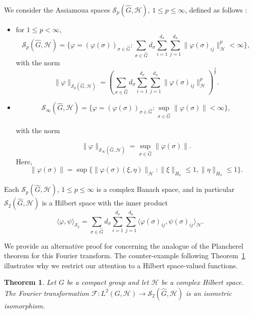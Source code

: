 \documentclass[10pt,a4paper]{amsart}
\newtheorem{theorem}{Theorem}[section]
\begin{document}
We consider the Assiamoua spaces $\mathscr{S}_p(\widehat{G}, \mathcal{H}),\, 1\le p\le \infty$, defined as follows \cite{Mensah2024}:
\begin{itemize}
\item for $1\le p<\infty$, 
$$\mathscr{S}_p(\widehat{G},\mathcal{H})=\Big\{\varphi=(\varphi(\sigma))_{\sigma\in \widehat{G}}:
\sum_{\sigma\in \widehat{G}} d_\sigma\sum_{i=1}^{d_\sigma}\sum_{j=1}^{d_\sigma}\|\varphi(\sigma)_{ij}\|_\mathcal{H}^p<\infty\Big\},
$$
with the norm 
$$ \|\varphi\|_{\mathscr{S}_p(\widehat{G},\mathcal{H})}=\left(\sum_{\sigma\in \widehat{G}} d_\sigma\sum_{i=1}^{d_\sigma}\sum_{j=1}^{d_\sigma}\|\varphi(\sigma)_{ij}\|_\mathcal{H}^p\right)^{\frac{1}{p}}.
$$
\item $$\mathscr{S}_\infty(\widehat{G},\mathcal{H})=\Big\{  \varphi=(\varphi(\sigma))_{\sigma\in \widehat{G}}: \sup_{\sigma \in \widehat{G}}\|\varphi(\sigma)\| <\infty \Big\},$$

with the norm 

$$\|\varphi\|_{\mathscr{S}_\infty(\widehat{G},\mathcal{H})}=\sup_{\sigma \in \widehat{G}}\|\varphi(\sigma)\|.$$
Here,  
$$\|\varphi(\sigma)\|=\sup\Big\{\|\varphi(\sigma)(\xi,\eta)\|_{\mathcal{H}}: \|\xi\|_{H_\sigma}\leq 1, \|\eta\|_{H_\sigma}\leq 1\Big\}.$$
\end{itemize}

 
\noindent Each $\mathscr{S}_p(\widehat{G},\mathcal{H}), \, 1\leq p\leq \infty$ is a complex Banach
space, and in particular $\mathscr{S}_2(\widehat{G},\mathcal{H})$ is a Hilbert space with the inner product
$$\langle\varphi,\psi\rangle_{\mathscr{S}_2}=\sum_{\sigma\in \widehat{G}} d_\sigma\sum_{i=1}^{d_\sigma}\sum_{j=1}^{d_\sigma}\langle
\varphi(\sigma)_{ij},\psi(\sigma)_{ij}\rangle_\mathcal{H}.$$

\noindent We provide an alternative proof for \cite[Theorem 4.8]{Assiamoua1989} concerning the analogue of the Plancherel theorem for this Fourier transform. The counter-example following  Theorem~\ref{theo:plancherel} illustrates why we restrict our attention to a Hilbert space-valued functions. 
\begin{theorem}\label{theo:plancherel}
Let $G$ be a compact group and let $\mathcal{H}$ be a complex Hilbert space.   The Fourier transformation $\mathscr{F}:L^2(G,\mathcal{H})\to \mathscr{S}_2(\widehat{G},\mathcal{H})$ is an isometric isomorphism.
\end{theorem}
\end{document}
